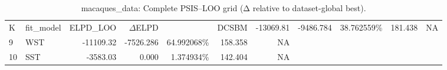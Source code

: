 \begin{table}[!h]
\centering
\caption{macaques_data: Complete PSIS–LOO grid (Δ relative to dataset-global best).\\\label{tab:app-macaques_data-A-psisloo-full}}
\centering
\begin{tabular}[t]{llrrrrr}
\toprule
K & fit_model & ELPD\_LOO & $\Delta$ELPD & %
 & DCSBM & -13069.81 & -9486.784 & 38.762559\% & 181.438 & NA\\
9 & WST & -11109.32 & -7526.286 & 64.992068\% & 158.358 & NA\\
10 & SST & -3583.03 & 0.000 & 1.374934\% & 142.404 & NA\\
\bottomrule
\end{tabular}
\end{table}
